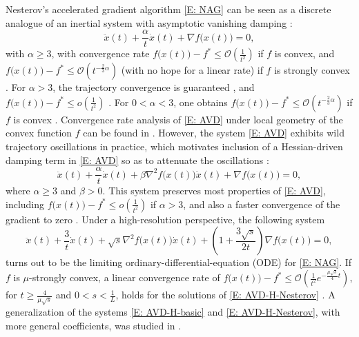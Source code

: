 \documentclass[onefignum,onetabnum]{siamart220329}
\begin{document}
Nesterov's accelerated gradient algorithm \eqref{E: NAG} can be seen as a discrete analogue of an inertial system with asymptotic vanishing damping \cite{Su_2016}:
\begin{equation}\label{E: AVD}
\ddot{x}(t) + \frac{\alpha}{t}\dot{x}(t) + \nabla f\big(x(t)\big) = 0,
\end{equation}
with $\alpha\ge3$, with convergence rate $f\big(x(t)\big) - f^* \le \mathcal{O}\left( \frac{1}{t^2} \right)$ if $f$ is convex, and $f\big(x(t)\big) - f^* \le \mathcal{O}\left( t^{-\frac{2}{3}\alpha} \right)$ (with no hope for a linear rate) if $f$ is strongly convex \cite{Su_2016}. For $\alpha>3$, the trajectory convergence is guaranteed \cite{Attouch_2018}, and $f\big(x(t)\big)-f^*\le o\left(\frac{1}{t^2}\right)$ \cite{May_2017}. For $0<\alpha<3$, one obtains $f\big(x(t)\big) - f^* \le \mathcal{O}\left( t^{-\frac{2}{3}\alpha} \right)$ if $f$ is convex \cite{Attouch_2019}. Convergence rate analysis of \eqref{E: AVD} under local geometry of the convex function $f$ can be found in \cite{Aujol_2019}. However, the system \eqref{E: AVD} exhibits wild trajectory oscillations in practice, which motivates inclusion of a Hessian-driven damping term in \eqref{E: AVD} so as to attenuate the oscillations \cite{Attouch_2016_Hessian}:
\begin{equation}\label{E: AVD-H-basic}
\ddot{x}(t) + \frac{\alpha}{t}\dot{x}(t) + \beta\nabla^2 f\big(x(t)\big) \dot{x}(t) + \nabla f\big(x(t)\big) = 0,
\end{equation}
where $\alpha\ge 3$ and $\beta>0$. This system preserves most properties of \eqref{E: AVD}, including $f\big(x(t)\big) - f^* \le o\left( \frac{1}{t^2} \right)$ if $\alpha>3$, and also a faster convergence of the gradient to zero \cite{Attouch_2016_Hessian}. Under a high-resolution perspective, the following system \cite{Shi_2022}
\begin{equation}\label{E: AVD-H-Nesterov}
\ddot{x}(t) + \frac{3}{t}\dot{x}(t) + \sqrt{s}\nabla^2 f\big(x(t)\big) \dot{x}(t) + \left(1 + \frac{3\sqrt{s}}{2t} \right) \nabla f\big(x(t)\big) = 0,
\end{equation}
turns out to be the limiting ordinary-differential-equation (ODE) for \eqref{E: NAG}. If $f$ is $\mu$-strongly convex, a linear convergence rate of $f\big(x(t)\big) - f^* \le \mathcal{O}\left( \frac{1}{t^2}e^{-\frac{\mu\sqrt{s}}{4}t} \right)$, for $t\ge \frac{4}{\mu\sqrt{s}}$ and $0<s<\frac{1}{L}$, holds for the solutions of \eqref{E: AVD-H-Nesterov} \cite{Shi_2024}. A generalization of the systems \eqref{E: AVD-H-basic} and \eqref{E: AVD-H-Nesterov}, with more general coefficients, was studied in \cite{Attouch_2022}. 
\end{document}
